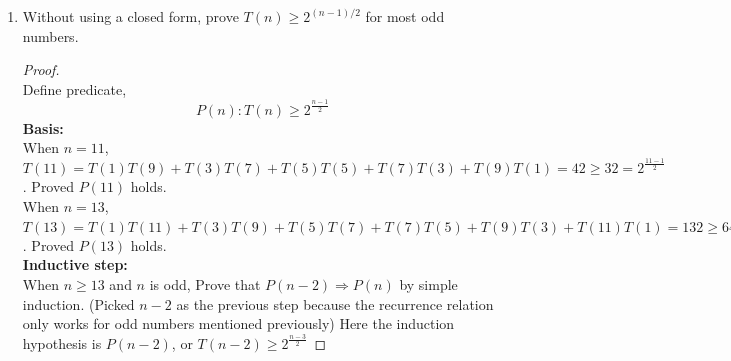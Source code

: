 \documentclass[11pt]{article}
\theoremstyle{plain}%
\theoremstyle{definition}
\theoremstyle{remark}
\newtheorem*{rem}{Remark}
\newenvironment{solution}
  {\begin{proof}[Solution]}
  {\end{proof}}
\begin{document}
\begin{enumerate}
\begin{solution}
    When $n=1$, the full binary tree is just one node and therefore $T(n)=1$. When $n>1$, a full binary tree can be decomposed into an arbitrary left and right subtrees. Let size of left tree be $n_l$, then the size of right tree is $n_r = n-1-n_l$. We can then recursively determine the number of distinct full binary trees for the arbitrary left and right subtrees as $T(n_l)$ and $T(n_r)$. Here, $T(n_l)T(n_r)$ represents the number of unique full binary tree for a fixed $n_l$ number of nodes in the left subtree. And since there is $k_n = \frac{n-1}{2}$ possible unique subtrees for a full binary tree of size $n$ proved earlier, the number of distinct full binary tree is the summation of $T(n_l)T(n_r)$ for $n_l\in \{ 2x-1: x\in \{ 1...k_n\} \}$, or symbolically
    \begin{align*}
        T(n) &= \sum_{i=1}^{k_n}{T(2i-1)T(n-1-(2i-1))} \\
        &= \sum_{i=1}^{\frac{n-1}{2}}{T(2i-1)T(n-2i))}
    \end{align*}
    Therefore,
    \begin{equation*}
      T(n) =
      \begin{cases}
        1, & n = 1\\
        \sum_{i=1}^{\frac{n-1}{2}}{T(2i-1)T(n-2i))}, & n > 1 \text{ n is odd}\\
      \end{cases}
    \end{equation*}
    \begin{rem}
      Note that a full binary tree with size $n$ has odd number of nodes.
    \end{rem}
  \end{solution}
  \item Without using a closed form, prove $T(n) \geq 2^{(n-1)/2}$ for most odd numbers.
  \begin{proof}
    $ $\\
    Define predicate,
    \[
      P(n): T(n) \geq 2^{\frac{n-1}{2}}
    \]
    \textbf{Basis:}\\
    When $n=11$, $T(11) = T(1)T(9) + T(3)T(7) + T(5)T(5) + T(7)T(3) + T(9)T(1) = 42 \geq 32 = 2^{\frac{11-1}{2}}$. Proved $P(11)$ holds.\\
    When $n=13$, $T(13) = T(1)T(11) + T(3)T(9) + T(5)T(7) + T(7)T(5) + T(9)T(3) + T(11)T(1) = 132 \geq 64 = 2^{\frac{13-1}{2}}$. Proved $P(13)$ holds.\\
    \textbf{Inductive step:}\\
    When $n\geq 13$ and $n$ is odd, Prove that $P(n-2)\Rightarrow P(n)$ by simple induction. (Picked $n-2$ as the previous step because the recurrence relation only works for odd numbers mentioned previously) Here the induction hypothesis is $P(n-2)$, or $T(n-2) \geq 2^{\frac{n-3}{2}}$

\end{proof}
\end{enumerate}
\end{document}
